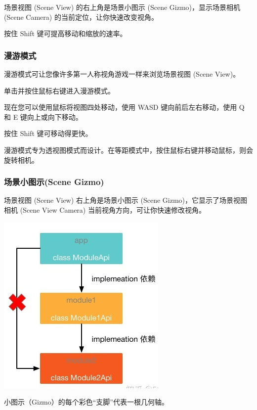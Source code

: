 \documentclass[9pt, b5paper]{article}
\begin{document}
场景视图 (Scene View) 的右上角是场景小图示 (Scene Gizmo)，显示场景相机 (Scene Camera) 的当前定位，让你快速改变视角。

按住 Shift 键可提高移动和缩放的速率。

\subsubsection{漫游模式}
\label{sec:orge7ebcba}

漫游模式可让您像许多第一人称视角游戏一样来浏览场景视图 (Scene View)。

单击并按住鼠标右键进入漫游模式。

现在您可以使用鼠标将视图四处移动，使用 WASD 键向前后左右移动，使用 Q 和 E 键向上或向下移动。

按住 Shift 键可移动得更快。

漫游模式专为透视图模式而设计。在等距模式中，按住鼠标右键并移动鼠标，则会旋转相机。

\subsubsection{场景小图示(Scene Gizmo)}
\label{sec:orgda37a06}

场景视图 (Scene View) 右上角是场景小图示 (Scene Gizmo)，它显示了场景视图相机 (Scene View Camera) 当前视角方向，可让你快速修改视角。

\begin{center}
\includegraphics[width=.9\linewidth]{./pic/2.png}
\end{center}
小图示（Gizmo）的每个彩色“支脚”代表一根几何轴。
\end{document}
